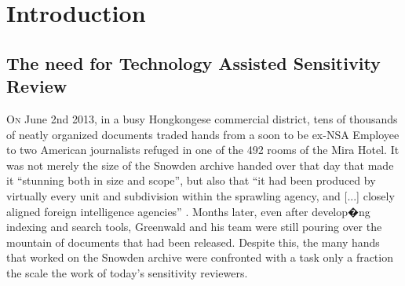 \documentclass{l4proj}
\begin{document}
\tableofcontents

%
%
%
%
%
%
%
%



\chapter{Introduction}


\section{The need for Technology Assisted Sensitivity Review}

\lettrine[lines=3,nindent=0em]{O}{n} June 2nd 2013, in a busy Hongkongese commercial district, tens of thousands of neatly organized documents traded hands from a soon to be ex-NSA Employee to two American journalists refuged in one of the 492 rooms of the Mira Hotel.
It was not merely the size of the Snowden archive handed over that day that made it ``stunning both in size and scope'', but also that ``it had been produced by virtually every unit and subdivision within the sprawling agency, and [...] closely aligned foreign intelligence agencies'' \autocite[77]{greenwaldNoPlaceHide2014}.
Months later, even after develop�ng indexing and search tools, Greenwald and his team were still pouring over the mountain of documents that had been released.
Despite this, the many hands that worked on the Snowden archive were confronted with a task only a fraction the scale the work of today's sensitivity reviewers.
\end{document}
